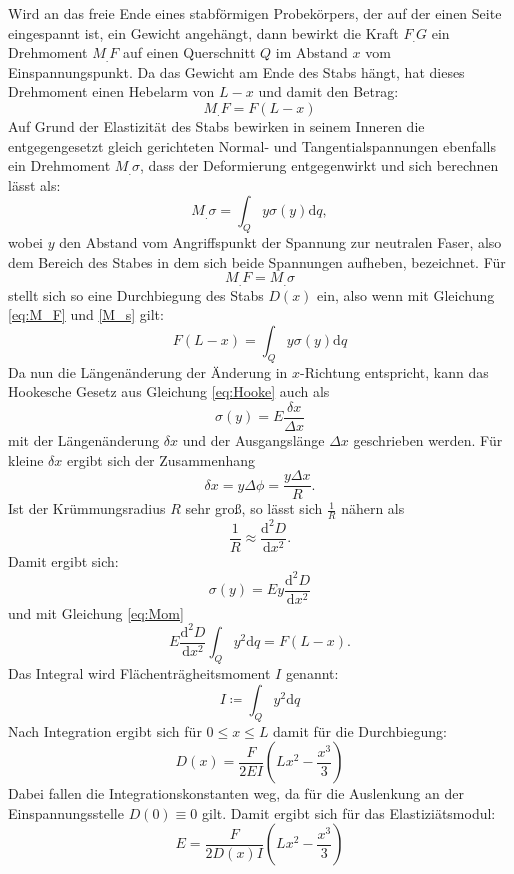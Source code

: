Wird an das freie Ende eines stabförmigen Probekörpers, der auf der einen Seite eingespannt ist, ein Gewicht angehängt, dann bewirkt die Kraft $F_.G$ ein Drehmoment $M_.F$ auf einen Querschnitt $Q$ im Abstand $x$ vom Einspannungspunkt.
Da das Gewicht am Ende des Stabs hängt, hat dieses Drehmoment einen Hebelarm von $L-x$ und damit den Betrag:
\begin{equation}
M_.F = F(L-x) \label{eq:M_F}
\end{equation}
Auf Grund der Elastizität des Stabs bewirken in seinem Inneren die entgegengesetzt gleich gerichteten Normal- und Tangentialspannungen ebenfalls ein Drehmoment $M_.{\sigma}$, dass der Deformierung entgegenwirkt und sich berechnen lässt als:
\begin{equation}
M_.{\sigma} = \int_Q y \sigma (y) \mathrm{d}q, \label{M_s}
\end{equation}
wobei $y$ den Abstand vom Angriffspunkt der Spannung zur neutralen Faser, also dem Bereich des Stabes in dem sich beide Spannungen aufheben, bezeichnet.
Für
\begin{equation*}
M_.F = M_.{\sigma}
\end{equation*}
stellt sich so eine Durchbiegung des Stabs $D(x)$ ein, also wenn mit Gleichung \eqref{eq:M_F} und \eqref{M_s} gilt:
\begin{equation}
F(L-x) = \int_Q y \sigma (y) \mathrm{d}q \label{eq:Mom}
\end{equation}
Da nun die Längenänderung der Änderung in $x$-Richtung entspricht, kann das Hookesche Gesetz aus Gleichung \eqref{eq:Hooke} auch als 
\[
\sigma (y) = E \frac{\delta x}{\Delta x} 
\]
mit der Längenänderung $\delta x$ und der Ausgangslänge $\Delta x$ geschrieben werden.
Für kleine $\delta x$ ergibt sich der Zusammenhang 
\[
\delta x = y \Delta\phi = \frac{y\Delta x}{R} \text{.}
\]
Ist der Krümmungsradius $R$ sehr groß, so lässt sich $\frac{1}{R}$ nähern als
\[
\frac{1}{R}\approx \frac{\mathrm{d}^2D}{\mathrm{d}x^2}\text{.}
\]
Damit ergibt sich:
\[
\sigma (y) = E y \frac{\mathrm{d}^2D}{\mathrm{d}x^2}
\]
und mit Gleichung \eqref{eq:Mom}
\begin{equation}
E \frac{\mathrm{d}^2D}{\mathrm{d}x^2} \int_Q y^2 \mathrm{d}q = F(L-x)\text{.} \label{eq:Mom2}
\end{equation}
Das Integral wird Flächenträgheitsmoment $I$ genannt:
\[
I \coloneqq \int_Q y^2 \mathrm{d}q
\]
Nach Integration ergibt sich für $0 \leq x \leq L$  damit für die Durchbiegung:
\begin{equation*}
D(x) = \frac{F}{2 E I}\left(L x^2 -\frac{x^3}{3}\right)
\end{equation*}
Dabei fallen die Integrationskonstanten weg, da für die Auslenkung an der Einspannungsstelle $D(0) \equiv 0$ gilt.
Damit ergibt sich für das Elastiziätsmodul:
\begin{equation}
E = \frac{F}{2 D(x) I}\left(L x^2 -\frac{x^3}{3}\right)\label{eq:E}
\end{equation}


